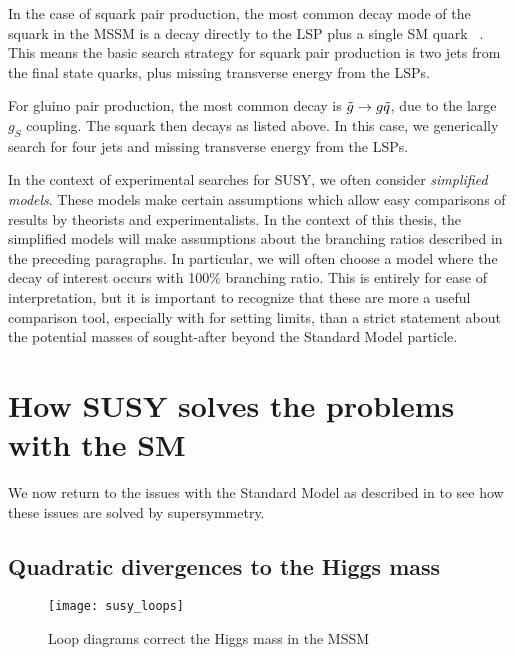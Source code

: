 In the case of squark pair production, the most common decay mode of the squark in the MSSM is a decay directly to the LSP plus a single SM quark ~\cite{susyPrimer}.
This means the basic search strategy for squark pair production is two jets from the final state quarks, plus missing transverse energy from the LSPs.

For gluino pair production, the most common decay is $\tilde{g} \rightarrow g \tilde{q}$, due to the large $g_S$ coupling.
The squark then decays as listed above.
In this case, we generically search for four jets and missing transverse energy from the LSPs.

In the context of experimental searches for SUSY, we often consider \textit{simplified models}.
These models make certain assumptions which allow easy comparisons of results by theorists and experimentalists.
In the context of this thesis, the simplified models will make assumptions about the branching ratios described in the preceding paragraphs.
In particular, we will often choose a model where the decay of interest occurs with 100\% branching ratio.
This is entirely for ease of interpretation, but it is important to recognize that these are more a useful comparison tool, especially with for setting limits, than a strict statement about the potential masses of sought-after beyond the Standard Model particle.

\section{How SUSY solves the problems with the SM}

We now return to the issues with the Standard Model as described in  to see how these issues are solved by supersymmetry.

\subsection{Quadratic divergences to the Higgs mass}

\begin{figure}
\caption{Loop diagrams correct the Higgs mass in the MSSM}\label{fig:susy_loops}
\texttt{[image: susy\_loops]}
\end{figure}

